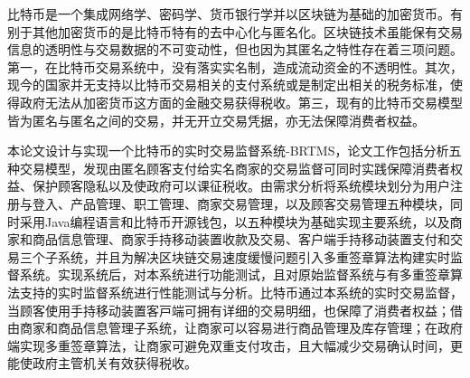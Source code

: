  
\begin{cabstract}

	⽐特币是⼀个集成网络学、密码学、货币银⾏学并以区块链为基础的加密货币。有别于其他加密货币的是⽐特币特有的去中⼼化与匿名化。区块链技术虽能保有交易信息的透明性与交易数据的不可变动性，但也因为其匿名之特性存在着三项问题。第一，在⽐特币交易系统中，没有落实实名制，造成流动资金的不透明性。其次，现今的国家并无⽀持以⽐特币交易相关的⽀付系统或是制定出相关的税务标准，使得政府无法从加密货币这⽅⾯的⾦融交易获得税收。第三，现有的⽐特币交易模型皆为匿名与匿名之间的交易，并无开⽴交易凭据，亦无法保障消费者权益。

	本论⽂设计与实现⼀个比特币的实时交易监督系统-BRTMS，论文工作包括分析五种交易模型，发现由匿名顾客支付给实名商家的交易监督可同时实践保障消费者权益、保护顾客隐私以及使政府可以课征税收。由需求分析将系统模块划分为用户注册与登入、产品管理、职工管理、商家交易管理，以及顾客交易管理五种模块，同时采用Java编程语言和比特币开源钱包，以五种模块为基础实现主要系统，以及商家和商品信息管理、商家手持移动装置收款及交易、客户端手持移动装置支付和交易三个子系统，并且为解决区块链交易速度缓慢问题引入多重签章算法构建实时监督系统。实现系统后，对本系统进行功能测试，且对原始监督系统与有多重签章算法支持的实时监督系统进行性能测试与分析。比特币通过本系统的实时交易监督，当顾客使用手持移动装置客⼾端可拥有详细的交易明细，也保障了消费者权益；借由商家和商品信息管理子系统，让商家可以容易进⾏商品管理及库存管理；在政府端实现多重签章算法，让商家可避免双重⽀付攻击，且大幅减少交易确认时间，更能使政府主管机关有效获得税收。

\end{cabstract}

